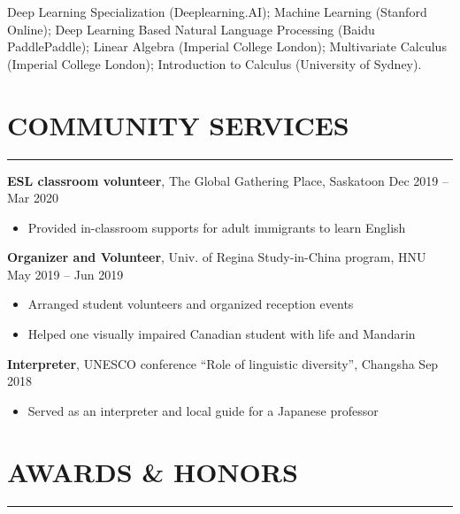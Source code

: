 \documentclass[a4paper, 11pt]{article}  %
\begin{document}
Deep Learning Specialization (Deeplearning.AI); Machine Learning (Stanford Online); Deep Learning Based Natural Language Processing (Baidu PaddlePaddle); Linear Algebra (Imperial College London); Multivariate Calculus (Imperial College London); Introduction to Calculus (University of Sydney).

\section*{COMMUNITY SERVICES}
\hrule 
\vspace{11pt}

\textbf{ESL classroom volunteer},  The Global Gathering Place, Saskatoon \hfill Dec 2019 – Mar 2020
\begin{itemize}
	\itemsep0em 
	
	\item{Provided in-classroom supports for adult immigrants to learn English}
	
\end{itemize}

\vspace{11pt}

\noindent
\textbf{Organizer and Volunteer}, Univ. of Regina Study-in-China program, HNU \hfill May 2019 – Jun 2019
\begin{itemize}
	\itemsep0em 
	
	\item{Arranged student volunteers and organized reception events}
	\item{Helped one visually impaired Canadian student with life and Mandarin}
	
\end{itemize}

\vspace{11pt}

\noindent
\textbf{Interpreter}, UNESCO conference “Role of linguistic diversity”, Changsha \hfill Sep 2018
\begin{itemize}
	\itemsep0em 
	
	\item{Served as an interpreter and local guide for a Japanese professor}
	
\end{itemize}

\section*{AWARDS \& HONORS}
\hrule 
\vspace{11pt}
\end{document}
